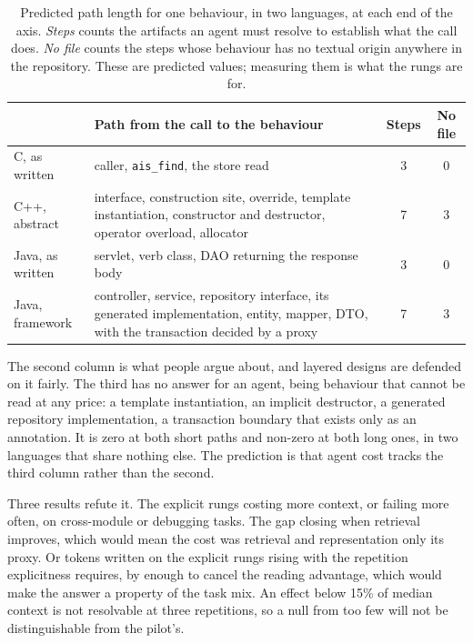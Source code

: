 \documentclass[11pt,a4paper]{article}
\begin{document}
\begin{table}[H]
\centering
\small
\begin{tabular}{p{2.6cm}p{8.4cm}cc}
\toprule
& Path from the call to the behaviour & Steps & No file \\
\midrule
C, as written & caller, \texttt{ais\_find}, the store read & 3 & 0 \\
C++, abstract & interface, construction site, override, template instantiation, constructor and destructor, operator overload, allocator & 7 & 3 \\
\addlinespace
Java, as written & servlet, verb class, DAO returning the response body & 3 & 0 \\
Java, framework & controller, service, repository interface, its generated implementation, entity, mapper, DTO, with the transaction decided by a proxy & 7 & 3 \\
\bottomrule
\end{tabular}
\caption{Predicted path length for one behaviour, in two languages, at each end of the axis. \emph{Steps} counts the artifacts an agent must resolve to establish what the call does. \emph{No file} counts the steps whose behaviour has no textual origin anywhere in the repository. These are predicted values; measuring them is what the rungs are for.}
\label{tab:paths}
\end{table}

The second column is what people argue about, and layered designs are defended on it fairly. The third has no answer for an agent, being behaviour that cannot be read at any price: a template instantiation, an implicit destructor, a generated repository implementation, a transaction boundary that exists only as an annotation. It is zero at both short paths and non-zero at both long ones, in two languages that share nothing else. The prediction is that agent cost tracks the third column rather than the second.

Three results refute it. The explicit rungs costing more context, or failing more often, on cross-module or debugging tasks. The gap closing when retrieval improves, which would mean the cost was retrieval and representation only its proxy. Or tokens written on the explicit rungs rising with the repetition explicitness requires, by enough to cancel the reading advantage, which would make the answer a property of the task mix. An effect below 15\% of median context is not resolvable at three repetitions, so a null from too few will not be distinguishable from the pilot's.
\end{document}
